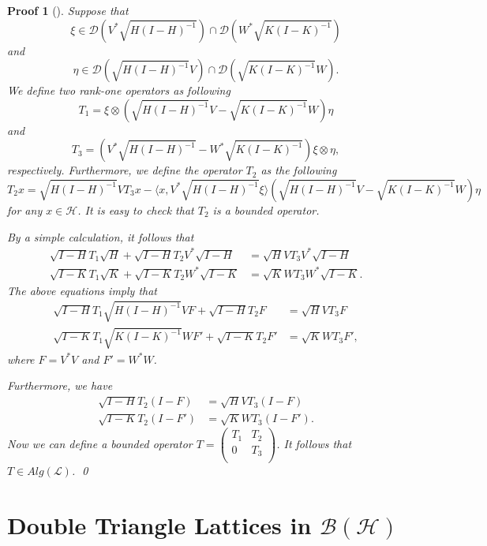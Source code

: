 \documentclass{jaums}
\theoremstyle{thmit} %
\theoremstyle{thmrm} %
\newtheorem*{oldproof}{Proof}
\renewenvironment{proof}[1][{}]{\begin{oldproof}[#1]}{\qed\end{oldproof}}
\begin{document}
\begin{proof} Suppose that $$\xi\in \mathcal{D}(V^*\sqrt{H(I-H)^{-1}})\cap
\mathcal{D}(W^{*}\sqrt{K(I-K)^{-1}})$$
and $$\eta\in \mathcal{D}(\sqrt{H(I-H)^{-1}}V)\cap
\mathcal{D}(\sqrt{K(I-K)^{-1}}W).$$
We define two rank-one operators as following
 $$T_1=\xi\otimes(\sqrt{H(I-H)^{-1}}V-\sqrt{K(I-K)^{-1}}W)\eta$$
 and
 $$T_3=(V^*\sqrt{H(I-H)^{-1}}-W^{*}\sqrt{K(I-K)^{-1}})
\xi\otimes\eta,$$ respectively. Furthermore, we define the operator $T_2$ as the
following
$$T_2x=\sqrt{H(I-H)^{-1}}VT_3x-\langle
x,V^*\sqrt{H(I-H)^{-1}}\xi\rangle(\sqrt{H(I-H)^{-1}}V-\sqrt{K(I-K)^{-1}}W)\eta$$
for any $x\in\mathcal{H}$.
It is easy to check that $T_2$ is a bounded operator.


By a simple calculation, it follows that
\begin{align*}
\sqrt{I-H}T_1\sqrt{H}+\sqrt{I-H}T_2V^*\sqrt{I-H} &= \sqrt{H}VT_3V^*\sqrt{I-H}\\
\sqrt{I-K}T_1\sqrt{K}+\sqrt{I-K}T_2W^{*}\sqrt{I-K} &=
\sqrt{K}WT_3W^{*}\sqrt{I-K}.
\end{align*}
The above equations imply that
\begin{align}
\sqrt{I-H}T_1\sqrt{H(I-H)^{-1}}VF+\sqrt{I-H}T_2F &= \sqrt{H}VT_3F\\
\sqrt{I-K}T_1\sqrt{K(I-K)^{-1}}WF'+\sqrt{I-K}T_2F' &= \sqrt{K}WT_3F',
\end{align}
where $F=V^*V$ and $F'=W^*W$.

Furthermore, we have
\begin{align*}
\sqrt{I-H}T_2(I-F)  &= \sqrt{H}VT_3(I-F)\\
\sqrt{I-K}T_2(I-F') &= \sqrt{K}WT_3(I-F').
\end{align*}
Now we can define a bounded operator $T=\left(
      \begin{array}{cc}
        T_1 & T_2  \\
        0   & T_3 \\
      \end{array}
    \right)$. It follows that $T\in Alg(\mathcal{L})$.
\end{proof}






\section{Double Triangle Lattices in $\mathcal{B}(\mathcal{H})$}
\end{document}
